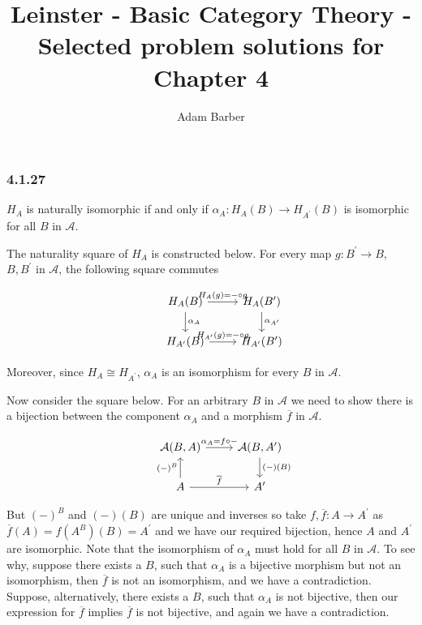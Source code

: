 \documentclass{article}
\begin{document}
\title{Leinster - Basic Category Theory - Selected problem solutions for Chapter 4}
\author{Adam Barber}

\maketitle

\subsubsection*{4.1.27}

$H_A$ is naturally isomorphic if and only if $\alpha_A: H_A(B) \rightarrow H_{A^\prime}(B)$ is isomorphic for all $B$ in $\mathcal{A}$.

The naturality square of $H_A$ is constructed below.
For every map $g: B^\prime \rightarrow B$, $B, B^\prime$ in $\mathcal{A}$, the following square commutes

\begin{equation*}
\begin{tikzcd}
  & H_A(B) \arrow[d,"\alpha_A"] \arrow[r, "H_A(g) = \mathit{-} \circ g"] & H_A(B^\prime) \arrow[d,"\alpha_{A^\prime}"] \\
  & H_{A^\prime}(B) \arrow[r,"H_{A^\prime}(g) = \mathit{-} \circ g"] & H_{A^\prime}(B^\prime)
\end{tikzcd}
\end{equation*}

Moreover, since $H_A \cong H_{A^\prime}$,  $\alpha_A$ is an isomorphism for every $B$ in $\mathcal{A}$.

Now consider the square below. For an arbitrary $B$ in $\mathcal{A}$ we need to show there is a bijection between the component $\alpha_A$ and a morphism $\overline{f}$ in $\mathcal{A}$.

\begin{equation*}
\begin{tikzcd}
  & \mathcal{A}(B,A) \arrow[r, "\alpha_A = f \circ \mathit{-}"] & \mathcal{A}(B,A^\prime) \arrow[d,"(\mathit{-})(B)"] \\
  & A \arrow[u,"(\mathit{-})^B"] \arrow[r,"\overline{f}"] & A^\prime
\end{tikzcd}
\end{equation*}

But $(\mathit{-})^B$ and $(\mathit{-})(B)$ are unique and inverses so take $f,\overline{f}\colon A \rightarrow A^\prime$ as $\overline{f}(A) = f(A^B)(B) = A^\prime$ and  we have our required bijection, hence $A$ and $A^\prime$ are isomorphic. Note that the isomorphism of $\alpha_A$ must hold for all $B$ in $\mathcal{A}$. To see why, suppose there exists a $B$, such that $\alpha_A$ is a bijective morphism but not an isomorphism, then $\overline{f}$ is not an isomorphism, and we have a contradiction. Suppose, alternatively, there exists a $B$, such that $\alpha_A$ is not bijective, then our expression for $\overline{f}$ implies $\overline{f}$ is not bijective, and again we have a contradiction.
\end{document}
